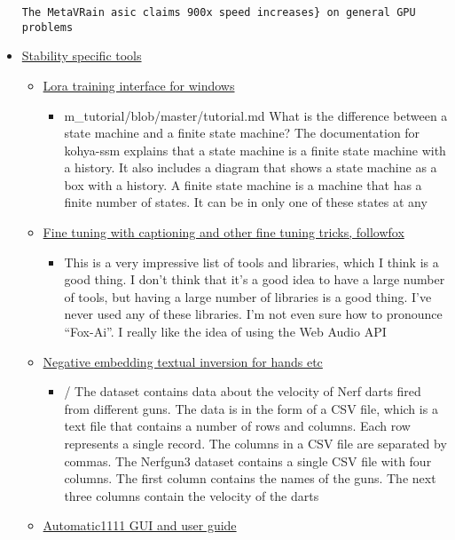\begin{itemize}
\begin{verbatim}
The MetaVRain asic claims 900x speed increases} on general GPU problems
\end{verbatim}
\item
  \href{https://sdtools.org/}{Stability specific tools}

  \begin{itemize}
  \item
    \href{https://github.com/bmaltais/kohya_ss}{Lora training interface
    for windows}

    \begin{itemize}
    \tightlist
    \item
      m\_tutorial/blob/master/tutorial.md What is the difference between
      a state machine and a finite state machine? The documentation for
      kohya-ssm explains that a state machine is a finite state machine
      with a history. It also includes a diagram that shows a state
      machine as a box with a history. A finite state machine is a
      machine that has a finite number of states. It can be in only one
      of these states at any
    \end{itemize}
  \item
    \href{https://substack.com/profile/110613456-followfoxai}{Fine
    tuning with captioning and other fine tuning tricks, followfox}

    \begin{itemize}
    \tightlist
    \item
      This is a very impressive list of tools and libraries, which I
      think is a good thing. I don't think that it's a good idea to have
      a large number of tools, but having a large number of libraries is
      a good thing. I've never used any of these libraries. I'm not even
      sure how to pronounce ``Fox-Ai''. I really like the idea of using
      the Web Audio API
    \end{itemize}
  \item
    \href{https://huggingface.co/datasets/Nerfgun3/bad_prompt}{Negative
    embedding textual inversion for hands etc}

    \begin{itemize}
    \tightlist
    \item
      / The dataset contains data about the velocity of Nerf darts fired
      from different guns. The data is in the form of a CSV file, which
      is a text file that contains a number of rows and columns. Each
      row represents a single record. The columns in a CSV file are
      separated by commas. The Nerfgun3 dataset contains a single CSV
      file with four columns. The first column contains the names of the
      guns. The next three columns contain the velocity of the darts
    \end{itemize}
  \item
    \href{https://www.thosesixfaces.com/post/stable-diffusion-getting-started-windows}{Automatic1111
    GUI and user guide}


\end{itemize}
\end{itemize}
